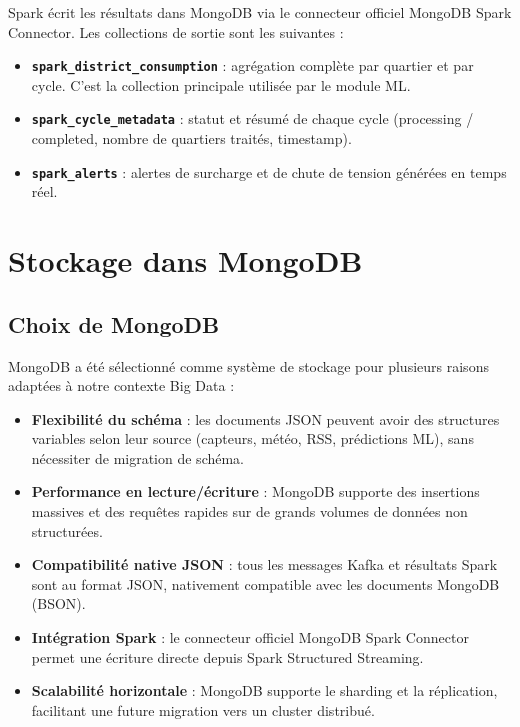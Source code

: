 \documentclass[12pt,a4paper]{report}
\begin{document}
Spark écrit les résultats dans MongoDB via le connecteur officiel MongoDB Spark Connector.
Les collections de sortie sont les suivantes :

\begin{itemize}
    \item \textbf{\texttt{spark\_district\_consumption}} : agrégation complète par
    quartier et par cycle. C'est la collection principale utilisée par le module ML.
    \item \textbf{\texttt{spark\_cycle\_metadata}} : statut et résumé de chaque cycle
    (processing / completed, nombre de quartiers traités, timestamp).
    \item \textbf{\texttt{spark\_alerts}} : alertes de surcharge et de chute de tension
    générées en temps réel.
\end{itemize}


\chapter{Stockage dans MongoDB}

\section{Choix de MongoDB}

MongoDB a été sélectionné comme système de stockage pour plusieurs raisons
adaptées à notre contexte Big Data :

\begin{itemize}
    \item \textbf{Flexibilité du schéma} : les documents JSON peuvent avoir des structures
    variables selon leur source (capteurs, météo, RSS, prédictions ML), sans nécessiter
    de migration de schéma.
    \item \textbf{Performance en lecture/écriture} : MongoDB supporte des insertions massives
    et des requêtes rapides sur de grands volumes de données non structurées.
    \item \textbf{Compatibilité native JSON} : tous les messages Kafka et résultats Spark
    sont au format JSON, nativement compatible avec les documents MongoDB (BSON).
    \item \textbf{Intégration Spark} : le connecteur officiel MongoDB Spark Connector permet
    une écriture directe depuis Spark Structured Streaming.
    \item \textbf{Scalabilité horizontale} : MongoDB supporte le sharding et la réplication,
    facilitant une future migration vers un cluster distribué.
\end{itemize}
\end{document}
